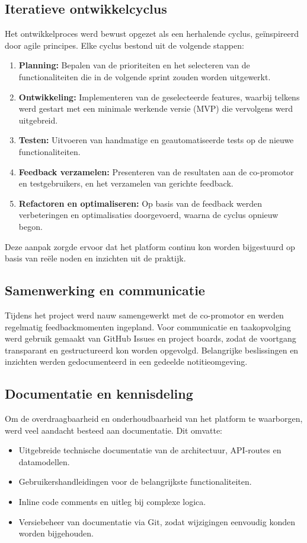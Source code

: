 \subsection{Iteratieve ontwikkelcyclus}
Het ontwikkelproces werd bewust opgezet als een herhalende cyclus, geïnspireerd door agile principes. Elke cyclus bestond uit de volgende stappen:
\begin{enumerate}
    \item \textbf{Planning:} Bepalen van de prioriteiten en het selecteren van de functionaliteiten die in de volgende sprint zouden worden uitgewerkt.
    \item \textbf{Ontwikkeling:} Implementeren van de geselecteerde features, waarbij telkens werd gestart met een minimale werkende versie (MVP) die vervolgens werd uitgebreid.
    \item \textbf{Testen:} Uitvoeren van handmatige en geautomatiseerde tests op de nieuwe functionaliteiten.
    \item \textbf{Feedback verzamelen:} Presenteren van de resultaten aan de co-promotor en testgebruikers, en het verzamelen van gerichte feedback.
    \item \textbf{Refactoren en optimaliseren:} Op basis van de feedback werden verbeteringen en optimalisaties doorgevoerd, waarna de cyclus opnieuw begon.
\end{enumerate}
Deze aanpak zorgde ervoor dat het platform continu kon worden bijgestuurd op basis van reële noden en inzichten uit de praktijk.

\subsection{Samenwerking en communicatie}
Tijdens het project werd nauw samengewerkt met de co-promotor en werden regelmatig feedbackmomenten ingepland. Voor communicatie en taakopvolging werd gebruik gemaakt van GitHub Issues en project boards, zodat de voortgang transparant en gestructureerd kon worden opgevolgd. Belangrijke beslissingen en inzichten werden gedocumenteerd in een gedeelde notitieomgeving.

\subsection{Documentatie en kennisdeling}
Om de overdraagbaarheid en onderhoudbaarheid van het platform te waarborgen, werd veel aandacht besteed aan documentatie. Dit omvatte:
\begin{itemize}
    \item Uitgebreide technische documentatie van de architectuur, API-routes en datamodellen.
    \item Gebruikershandleidingen voor de belangrijkste functionaliteiten.
    \item Inline code comments en uitleg bij complexe logica.
    \item Versiebeheer van documentatie via Git, zodat wijzigingen eenvoudig konden worden bijgehouden.
\end{itemize}

